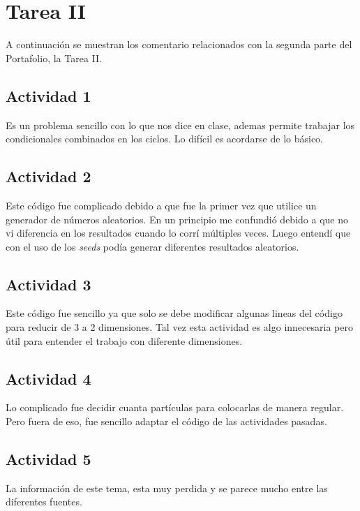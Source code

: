 \documentclass[12pt,letterpaper]{article}
\begin{document}
\pagebreak

\section{Tarea II}
A continuación se muestran  los comentario relacionados con la segunda parte del Portafolio, la Tarea II.
\vspace{-0.5cm}

\subsection*{Actividad 1}
Es un problema sencillo con lo que nos dice en clase, ademas permite trabajar los condicionales combinados en los ciclos. Lo difícil es acordarse de lo básico.


\subsection*{Actividad 2}
Este código fue complicado debido a que fue la primer vez que utilice un generador de números aleatorios. En un principio me confundió debido a que no vi diferencia en los resultados cuando lo corrí múltiples veces. Luego entendí que con el uso de los \textit{seeds} podía generar diferentes resultados aleatorios.


\subsection*{Actividad 3}
Este código fue sencillo ya que solo se debe modificar algunas lineas del código para reducir de 3 a 2 dimensiones. Tal vez esta actividad es algo innecesaria pero útil para entender el trabajo con diferente dimensiones.



\subsection*{Actividad 4}
Lo complicado fue decidir cuanta partículas para colocarlas de manera regular. Pero fuera de eso, fue sencillo adaptar el código de las actividades pasadas.


\subsection*{Actividad 5}
La información de este tema, esta muy perdida y se parece mucho entre las diferentes fuentes. 
\end{document}
